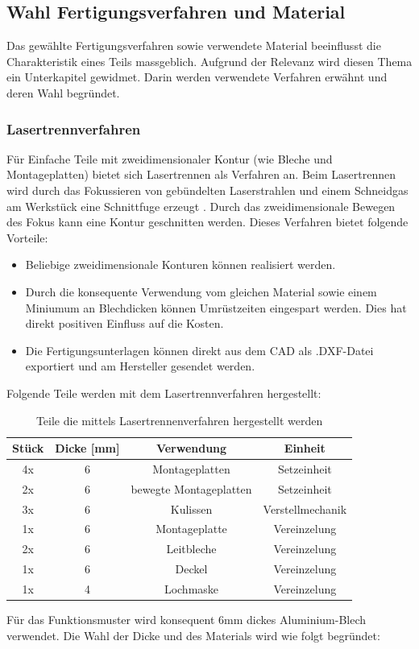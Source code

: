 \subsection{Wahl Fertigungsverfahren und Material}
Das gewählte Fertigungsverfahren sowie verwendete Material beeinflusst die Charakteristik eines Teils massgeblich. Aufgrund der Relevanz wird diesen Thema ein Unterkapitel gewidmet. Darin werden verwendete Verfahren erwähnt und deren Wahl begründet.

\subsubsection{Lasertrennverfahren}
Für Einfache Teile mit zweidimensionaler Kontur (wie Bleche und Montageplatten) bietet sich Lasertrennen als Verfahren an. Beim Lasertrennen wird durch das Fokussieren von gebündelten Laserstrahlen und einem Schneidgas am Werkstück eine Schnittfuge erzeugt \cite{laser}. Durch das zweidimensionale Bewegen des Fokus kann eine Kontur geschnitten werden. Dieses Verfahren bietet folgende Vorteile:

\begin{itemize}
	\item Beliebige zweidimensionale Konturen können realisiert werden.
	
	\item Durch die konsequente Verwendung vom gleichen Material sowie einem Miniumum an Blechdicken können Umrüstzeiten eingespart werden. Dies hat direkt positiven Einfluss auf die Kosten.
	
	\item Die Fertigungsunterlagen können direkt aus dem CAD als .DXF-Datei exportiert und am Hersteller gesendet werden. 
\end{itemize}
Folgende Teile werden mit dem Lasertrennverfahren hergestellt:

\begin{table}[H]
\begin{tabular}{|c|c|c|c|}
	\hline 
	Stück & Dicke [mm] & Verwendung & Einheit \\ 
	\hline 
	4x & 6 &Montageplatten & Setzeinheit \\ 
	\hline 
	2x & 6 & bewegte Montageplatten & Setzeinheit \\ 
	\hline 
	3x & 6 & Kulissen & Verstellmechanik \\ 
	\hline 
	1x & 6 & Montageplatte & Vereinzelung \\ 
	\hline 
	2x & 6 & Leitbleche  & Vereinzelung \\ 
	\hline 
	1x & 6 & Deckel & Vereinzelung \\ 
	\hline 
	1x & 4 & Lochmaske & Vereinzelung  \\ 
	\hline 
\end{tabular}
	\caption{Teile die mittels Lasertrennenverfahren hergestellt werden}
	\label{tab:lasertrennen}
\end{table} 
Für das Funktionsmuster wird konsequent 6mm dickes Aluminium-Blech verwendet. Die Wahl der Dicke und des Materials wird wie folgt begründet:

